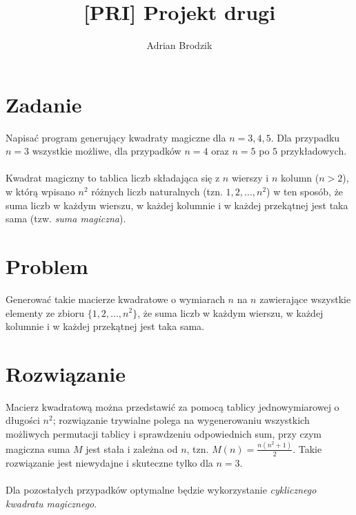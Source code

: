 \documentclass[a4paper, 12pt]{article}
\title{\bf [PRI] Projekt drugi}
\author{Adrian Brodzik}
\begin{document}
\maketitle

\section*{Zadanie}
Napisać program generujący kwadraty magiczne dla $n=3,4,5$. Dla przypadku $n=3$ wszystkie możliwe, dla przypadków $n=4$ oraz $n=5$ po $5$ przykładowych.
\\\\
Kwadrat magiczny to tablica liczb składająca się z $n$ wierszy i $n$ kolumn ($n>2$), w którą wpisano $n^{2}$ różnych liczb naturalnych (tzn. $1,2,...,n^{2}$) w ten sposób, że suma liczb w każdym wierszu, w każdej kolumnie i w każdej przekątnej jest taka sama (tzw. \textit{suma magiczna}).

\section*{Problem}
Generować takie macierze kwadratowe o wymiarach $n$ na $n$ zawierające wszystkie elementy ze zbioru $\{1,2,...,n^{2}\}$, że suma liczb w każdym wierszu, w każdej kolumnie i w każdej przekątnej jest taka sama.

\section*{Rozwiązanie}
Macierz kwadratową można przedstawić za pomocą tablicy jednowymiarowej o długości $n^{2}$; rozwiązanie trywialne polega na wygenerowaniu wszystkich możliwych permutacji tablicy i sprawdzeniu odpowiednich sum, przy czym magiczna suma $M$ jest stała i zależna od $n$, tzn. $M(n)=\frac{n(n^2+1)}{2}$. Takie rozwiązanie jest niewydajne i skuteczne tylko dla $n=3$.
\\
\\
Dla pozostałych przypadków optymalne będzie wykorzystanie \textit{cyklicznego kwadratu magicznego}.
\end{document}
